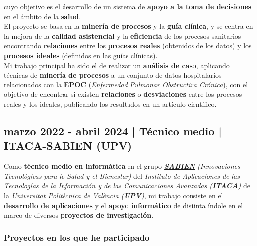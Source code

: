 \documentclass[letterpaper, 12pt, dvipsnames]{article}
\newcommand{\upvName}{Universitat Politècnica de València}
\newcommand{\upv}{UPV}
\newcommand{\upvUrl}{https://www.upv.es/es}
\newcommand{\sabien}{SABIEN}
\newcommand{\itacaSabien}{ITACA-SABIEN}
\newcommand{\sabienUrl}{http://www.sabien.upv.es/}
\begin{document}
cuyo objetivo es el desarrollo de un sistema de \textbf{apoyo a la toma de decisiones} en el ámbito de la \textbf{salud}.\\

El proyecto se basa en la \textbf{minería de procesos} y la \textbf{guía clínica}, y se centra en la mejora de la \textbf{calidad asistencial} y la \textbf{eficiencia} de los procesos sanitarios encontrando \textbf{relaciones} entre los \textbf{procesos reales} (obtenidos de los datos) y los \textbf{procesos ideales} (definidos en las guías clínicas).\\

Mi trabajo principal ha sido el de realizar un \textbf{análisis de caso}, aplicando técnicas de \textbf{minería de procesos} a un conjunto de datos hospitalarios relacionados con la \textbf{EPOC} (\emph{Enfermedad Pulmonar Obstructiva Crónica}), con el objetivo de encontrar si existen \textbf{relaciones} o \textbf{desviaciones} entre los procesos reales y los ideales, publicando los resultados en un artículo científico.

\subsection*{marzo 2022 - abril 2024 | Técnico medio | {\itacaSabien} (\upv)}

Como \textbf{técnico medio en informática} en el grupo \emph{\textbf{\href{\sabienUrl}{\sabien}} (Innovaciones Tecnológicas para la Salud y el Bienestar)} del \emph{Instituto de Aplicaciones de las Tecnologías de la Información y de las Comunicaciones Avanzadas (\textbf{\href{http://www.itaca.upv.es/}{ITACA}})} de la \emph{{\upvName} (\textbf{\href{\upvUrl}{\upv}})}, mi trabajo consiste en el \textbf{desarrollo de aplicaciones} y el \textbf{apoyo informático} de distinta índole en el marco de diversos \textbf{proyectos de investigación}.

\subsubsection*{Proyectos en los que he participado}

\vspace{1em}
\end{document}
